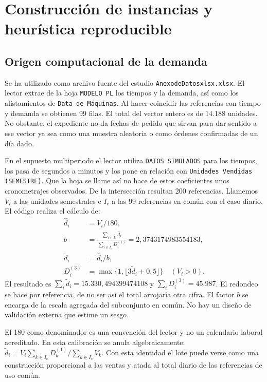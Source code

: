\clearpage
\section{Construcción de instancias y heurística reproducible}\label{an:construccion}
\subsection{Origen computacional de la demanda}
Se ha utilizado como archivo fuente del estudio \texttt{AnexodeDatosxlsx.xlsx}. El lector extrae de la hoja \texttt{MODELO PL} los tiempos y la demanda, así como los alistamientos de \texttt{Data de Máquinas}. Al hacer coincidir las referencias con tiempo y demanda se obtienen 99 filas. El total del vector entero es de 14.188 unidades. No obstante, el expediente no da fechas de pedido que sirvan para dar sentido a ese vector ya sea como una muestra aleatoria o como órdenes confirmadas de un día dado.

En el supuesto multiperiodo el lector utiliza \texttt{DATOS SIMULADOS} para los tiempos, los pasa de segundos a minutos y los pone en relación con \texttt{Unidades Vendidas (SEMESTRE)}. Que la hoja se llame así no hace de estos coeficientes unos cronometrajes observados. De la intersección resultan 200 referencias. Llamemos $V_i$ a las unidades semestrales e $I_c$ a las 99 referencias en común con el caso diario. El código realiza el cálculo de:
\begin{align}
\widehat d_i&=V_i/180,\\
b&=\frac{\sum_{i\in I_c}\widehat d_i}{\sum_{i\in I_c}D_i^{(1)}}
=2,3743174983554183,\\
\widetilde d_i&=\widehat d_i/b,\\
D_i^{(3)}&=\max\{1,\lfloor3\widetilde d_i+0,5\rfloor\}\quad(V_i>0).
\end{align}
El resultado es $\sum_i\widetilde d_i=15.330,494399474108$ y $\sum_iD_i^{(3)}=45.987$. El redondeo se hace por referencia, de no ser así el total arrojaría otra cifra. El factor $b$ se encarga de la escala agregada del subconjunto en común. No hay un diseño de validación externa que estime un sesgo.

El 180 como denominador es una convención del lector y no un calendario laboral acreditado. En esta calibración se anula algebraicamente: $\widetilde d_i=V_i\sum_{k\in I_c}D_k^{(1)}/\sum_{k\in I_c}V_k$. Con esta identidad el lote puede verse como una construcción proporcional a las ventas y atada al total diario de las referencias de uso común.

